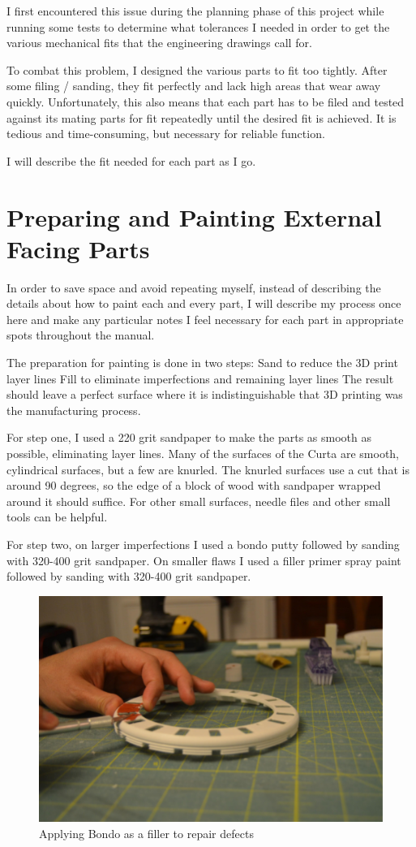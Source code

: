\documentclass[openany]{book}
\begin{document}
I first encountered this issue during the planning phase of this project while running some tests to determine what tolerances I needed in order to get the various mechanical fits that the engineering drawings call for.

To combat this problem, I designed the various parts to fit too tightly. After some filing / sanding, they fit perfectly and lack high areas that wear away quickly. Unfortunately, this also means that each part has to be filed and tested against its mating parts for fit repeatedly until the desired fit is achieved. It is tedious and time-consuming, but necessary for reliable function.

I will describe the fit needed for each part as I go.


\section{Preparing and Painting External Facing Parts}
In order to save space and avoid repeating myself, instead of describing the details about how to paint each and every part, I will describe my process once here and make any particular notes I feel necessary for each part in appropriate spots throughout the manual.

The preparation for painting is done in two steps:
Sand to reduce the 3D print layer lines
Fill to eliminate imperfections and remaining layer lines
The result should leave a perfect surface where it is indistinguishable that 3D printing was the manufacturing process.

For step one, I used a 220 grit sandpaper to make the parts as smooth as possible, eliminating layer lines. Many of the surfaces of the Curta are smooth, cylindrical surfaces, but a few are knurled. The knurled surfaces use a cut that is around 90 degrees, so the edge of a block of wood with sandpaper wrapped around it should suffice. For other small surfaces, needle files and other small tools can be helpful.

For step two, on larger imperfections I used a bondo putty followed by sanding with 320-400 grit sandpaper. On smaller flaws I used a filler primer spray paint followed by sanding with 320-400 grit sandpaper.

\begin{figure}[!ht]
	\centering
	\includegraphics[width=.75\textwidth]{images/image13.png}
	\caption{Applying Bondo as a filler to repair defects}
	\label{fig:image13}	
\end{figure}
\end{document}
